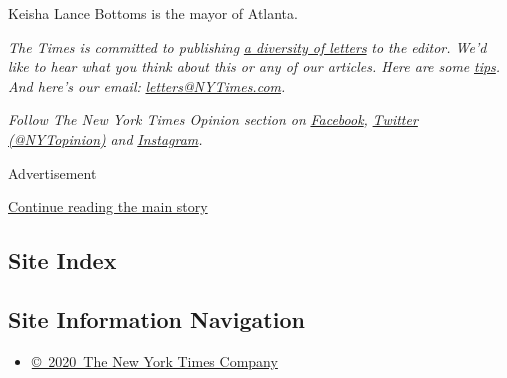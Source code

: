Keisha Lance Bottoms is the mayor of Atlanta.

\emph{The Times is committed to publishing}
\href{https://www.nytimes3xbfgragh.onion/2019/01/31/opinion/letters/letters-to-editor-new-york-times-women.html}{\emph{a
diversity of letters}} \emph{to the editor. We'd like to hear what you
think about this or any of our articles. Here are some}
\href{https://help.nytimes3xbfgragh.onion/hc/en-us/articles/115014925288-How-to-submit-a-letter-to-the-editor}{\emph{tips}}\emph{.
And here's our email:}
\href{mailto:letters@NYTimes.com}{\emph{letters@NYTimes.com}}\emph{.}

\emph{Follow The New York Times Opinion section on}
\href{https://www.facebookcorewwwi.onion/nytopinion}{\emph{Facebook}}\emph{,}
\href{http://twitter.com/NYTOpinion}{\emph{Twitter (@NYTopinion)}}
\emph{and}
\href{https://www.instagram.com/nytopinion/}{\emph{Instagram}}\emph{.}

Advertisement

\protect\hyperlink{after-bottom}{Continue reading the main story}

\hypertarget{site-index}{%
\subsection{Site Index}\label{site-index}}

\hypertarget{site-information-navigation}{%
\subsection{Site Information
Navigation}\label{site-information-navigation}}

\begin{itemize}
\tightlist
\item
  \href{https://help.nytimes3xbfgragh.onion/hc/en-us/articles/115014792127-Copyright-notice}{©~2020~The
  New York Times Company}
\end{itemize}

